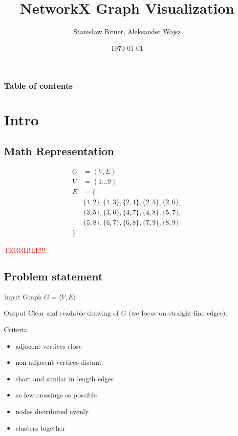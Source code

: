 \documentclass[11pt]{beamer}
\title{NetworkX Graph Visualization}
\author{Stanisław Bitner, Aleksander Wojsz}
\date{\today}
\begin{document}
\frame{\titlepage}

\begin{frame}
    \frametitle{Table of contents}
    \tableofcontents[hideallsubsections]
\end{frame}

\section{Intro}
\begin{frame}{\secname}
    \tableofcontents[currentsection,hideothersubsections,sectionstyle=hide]
\end{frame}

\subsection{Math Representation}
\begin{frame}{\subsecname}
    \begin{align*}
        G &= \left\langle V, E \right\rangle\\
        V &= \left\{ 1 \hdots 9 \right\}\\
        E &= \{\\
            &\{ 1, 2 \}, \{ 1, 3 \}, \{ 2, 4 \}, \{ 2, 5 \}, \{ 2, 6 \},\\
            &\{ 3, 5 \}, \{ 3, 6 \}, \{ 4, 7 \}, \{ 4, 8 \}, \{ 5, 7 \},\\
            &\{ 5, 8 \}, \{ 6, 7 \}, \{ 6, 8 \}, \{ 7, 9 \}, \{ 8, 9 \}\\
        \}
    \end{align*}
    
    \pause\center\Huge\textcolor{red}{TERRIBLE!!!}
\end{frame}

\subsection{Problem statement}
\begin{frame}{\subsecname}
    \begin{block}{Input}
        Graph $G = \langle V,E \rangle$
    \end{block}
    \pause
    \begin{block}{Output}
        Clear and readable drawing of $G$ (we focus on straight-line edges).
    \end{block}
    \pause
    \begin{block}{Criteria}
        \begin{itemize}
            \pause\item adjacent vertices close
            \pause\item non-adjacent vertices distant
            \pause\item short and similar in length edges
            \pause\item as few crossings as possible
            \pause\item nodes distributed evenly
            \pause\item clusters together
        \end{itemize}
    \end{block}
\end{frame}
\end{document}
